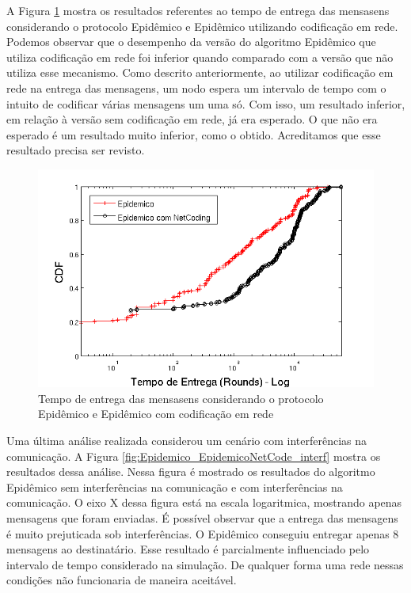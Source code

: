 
A Figura \ref{fig:Epidemico_EpidemicoNetCode} mostra os resultados
referentes ao tempo de entrega das mensasens considerando o protocolo
Epidêmico e Epidêmico utilizando codificação em rede. Podemos observar
que o desempenho da versão do algoritmo Epidêmico que utiliza
codificação em rede foi inferior quando comparado com a versão que não
utiliza esse mecanismo. Como descrito anteriormente, ao utilizar
codificação em rede na entrega das mensagens, um nodo espera um
intervalo de tempo com o intuito de codificar várias mensagens um uma
só. Com isso, um resultado inferior, em relação à versão sem codificação
em rede, já era esperado. O que não era esperado é um resultado muito
inferior, como o obtido. Acreditamos que esse resultado precisa ser
revisto.  

\begin{figure}[ht]
\centering
\includegraphics[width=.7\textwidth]{img/tempo_epidemico_EpidemNetCode.png}
\caption{Tempo de entrega das mensasens considerando o protocolo
Epidêmico e Epidêmico com codificação em rede}
\label{fig:Epidemico_EpidemicoNetCode}
\end{figure}

Uma última análise realizada considerou um cenário com interferências na
comunicação. A Figura \ref{fig:Epidemico_EpidemicoNetCode_interf} mostra
os resultados dessa análise. Nessa figura é mostrado os resultados do
algoritmo Epidêmico sem interferências na comunicação e com
interferências na comunicação.  O eixo X dessa figura está na escala
logaritmica, mostrando apenas mensagens que foram enviadas.  É possível
observar que a entrega das mensagens é muito prejuticada sob
interferências. O Epidêmico conseguiu entregar apenas 8 mensagens ao
destinatário. Esse resultado é parcialmente influenciado pelo intervalo
de tempo considerado na simulação. De qualquer forma uma rede nessas
condições não funcionaria de maneira aceitável.

